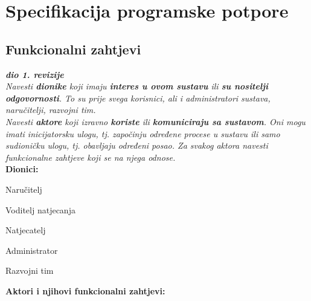 \chapter{Specifikacija programske potpore}
		
		
\section{Funkcionalni zahtjevi}

\textbf{\textit{dio 1. revizije}}\\

\textit{Navesti \textbf{dionike} koji imaju \textbf{interes u ovom sustavu} ili  \textbf{su nositelji odgovornosti}. To su prije svega korisnici, ali i administratori sustava, naručitelji, razvojni tim.}\\

\textit{Navesti \textbf{aktore} koji izravno \textbf{koriste} ili \textbf{komuniciraju sa sustavom}. Oni mogu imati inicijatorsku ulogu, tj. započinju određene procese u sustavu ili samo sudioničku ulogu, tj. obavljaju određeni posao. Za svakog aktora navesti funkcionalne zahtjeve koji se na njega odnose.}\\


\noindent \textbf{Dionici:}

\begin{packed_enum}
	\item Naručitelj
	\item Voditelj natjecanja
	\item Natjecatelj				
	\item Administrator
	\item Razvojni tim
	
\end{packed_enum}

\noindent \textbf{Aktori i njihovi funkcionalni zahtjevi:}


